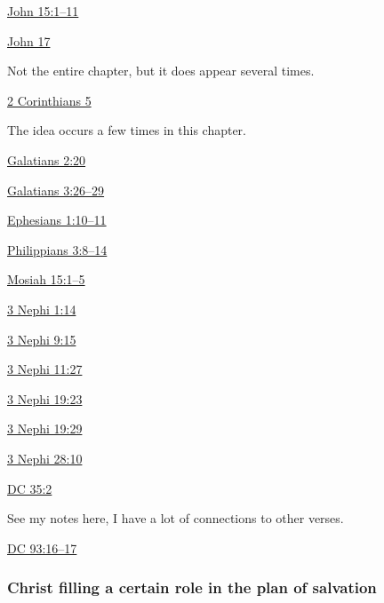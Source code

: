 			\begin{compactitem}
				\item \hyperref[JOHN-15-1]{John 15:1--11}
				\item \hyperref[JOHN-17]{John 17}
					\begin{compactitem}
						\item Not the entire chapter, but it does appear several times.
					\end{compactitem}
				\item \hyperref[2CORINTIHANS-5]{2 Corinthians 5}
					\begin{compactitem}
						\item The idea occurs a few times in this chapter.
					\end{compactitem}
				\item \hyperref[GALATIANS-2-20]{Galatians 2:20}
				\item \hyperref[GALATIANS-3-26]{Galatians 3:26--29}
				\item \hyperref[EPHESIANS-1-10]{Ephesians 1:10--11}
				\item \hyperref[PHILIPPIANS-3-8]{Philippians 3:8--14}
				\item \hyperref[MOSIAH-15-1]{Mosiah 15:1--5}
				\item \hyperref[3NEPHI-1-14]{3 Nephi 1:14}
				\item \hyperref[3NEPHI-9-15]{3 Nephi 9:15}
				\item \hyperref[3NEPHI-11-27]{3 Nephi 11:27}
				\item \hyperref[3NEPHI-19-23]{3 Nephi 19:23}
				\item \hyperref[3NEPHI-19-29]{3 Nephi 19:29}
				\item \hyperref[3NEPHI-28-10]{3 Nephi 28:10}
				\item \hyperref[DC35-2]{DC 35:2}
					\begin{compactitem}
						\item See my notes here, I have a lot of connections to other verses.
					\end{compactitem}
				\item \hyperref[DC93-16]{DC 93:16--17}
			\end{compactitem}
		
	\subsubsection{Christ filling a certain role in the plan of salvation}
		\label{CHRIST-role}
		
